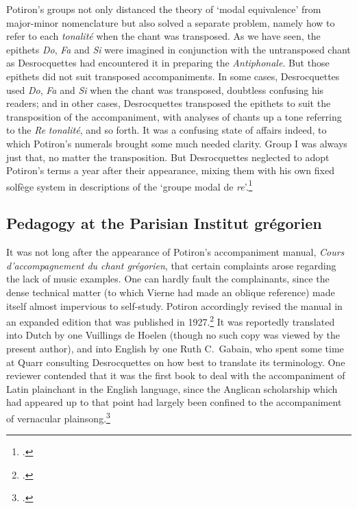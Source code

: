 Potiron's groups not only distanced the theory of `modal equivalence' from major-minor nomenclature but also solved a separate problem, namely how to refer to each \emph{tonalité} when the chant was transposed.
As we have seen, the epithets \emph{Do}, \emph{Fa} and \emph{Si}\kern 1pt\flat{} were imagined in conjunction with the untransposed chant as Desrocquettes had encountered it in preparing the \emph{Antiphonale}.
But those epithets did not suit transposed accompaniments.
In some cases, Desrocquettes used \emph{Do}, \emph{Fa} and \emph{Si}\kern 1pt\flat{} when the chant was transposed, doubtless confusing his readers; and in other cases, Desrocquettes transposed the epithets to suit the transposition of the accompaniment, with analyses of chants up a tone referring to the \emph{Re} \emph{tonalité}, and so forth.
It was a confusing state of affairs indeed, to which Potiron's numerals brought some much needed clarity.
Group I was always just that, no matter the transposition.
But Desrocquettes neglected to adopt Potiron's terms a year after their appearance, mixing them with his own fixed solfège system in descriptions of the `groupe modal de \emph{re}'.\footcite[144]{Desrocquettesexamenfinannee1926}

\subsection{Pedagogy at the Parisian Institut grégorien}
\label{hl:potiron_cours}%
It was not long after the appearance of Potiron's accompaniment manual, \emph{Cours d'accompagnement du chant grégorien}, that certain complaints arose regarding the lack of music examples.
One can hardly fault the complainants, since the dense technical matter (to which Vierne had made an oblique reference) made itself almost impervious to self-study.
Potiron accordingly revised the manual in an expanded edition that was published in 1927.\footcite[112]{PotironTreatiseAccompanimentGregorian1933}
It was reportedly translated into Dutch by one Vuillings de Hoelen (though no such copy was viewed by the present author), and into English by one Ruth C.\ Gabain, who spent some time at Quarr consulting Desrocquettes on how best to translate its terminology.
One reviewer contended that it was the first book to deal with the accompaniment of Latin plainchant in the English language, since the Anglican scholarship which had appeared up to that point had largely been confined to the accompaniment of vernacular plainsong.\footcite[534]{L.ReviewAccompanimentGregorian1934}

